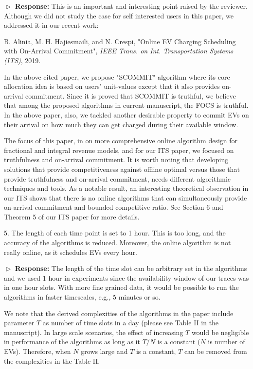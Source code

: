 \documentclass[11pt]{article}
\begin{document}
$\vartriangleright$ \noindent\textbf{Response:} 
This is an important and interesting point raised by the reviewer. Although we did not study the case for self interested users in this paper, we addressed it in our recent work: 

B. Alinia, M. H. Hajiesmaili, and N. Crespi, "Online EV Charging Scheduling with On-Arrival Commitment", \textit{IEEE Trans. on Int. Transportation Systems (ITS)}, 2019.

In the above cited paper, we propose "SCOMMIT" algorithm where its core allocation idea is based on users' unit-values except that it also provides on-arrival commitment. Since it is proved that SCOMMIT is truthful, we believe that among the proposed algorithms in current manuscript, the FOCS is truthful. In the above paper, also, we tackled another desirable property to commit EVs on their arrival on how much they can get charged during their available window. 

The focus of this paper, in on more comprehensive online algorithm design for fractional and integral revenue models, and for our ITS paper, we focused on truthfulness and on-arrival commitment. It is worth noting that developing solutions that provide competitiveness against offline optimal versus those that provide truthfulness and on-arrival commitment, needs different algorithmic techniques and tools. As a notable result, an interesting theoretical observation in our ITS shows that there is no online algorithms that can simultaneously provide on-arrival commitment and bounded competitive ratio. See Section 6 and Theorem 5 of our ITS paper for more details. 

\vspace{3mm}
{\color{blue} 5. The length of each time point is set to 1 hour. This is too long, and the accuracy of the algorithms is reduced. Moreover, the online algorithm is not really online, as it schedules EVs every hour. }
\vspace{3mm}

$\vartriangleright$ \noindent\textbf{Response:} 
The length of the time slot can be arbitrary set in the algorithms and we used 1 hour in experiments since the availability window of our traces was in one hour slots. With more fine grained data, it would be possible to run the algorithms in faster timescales, e.g., 5 minutes or so. 

We note that the derived complexities of the algorithms in the paper include parameter $T$ as number of time slots in a day (please see Table II in the manuscript). In large scale scenarios, the effect of increasing $T$ would be negligible in performance of the algorithms as long as it $T/N$ is a constant ($N$ is number of EVs). Therefore, when $N$ grows large and $T$ is a constant, $T$ can be removed from the complexities in the Table II. 
\end{document}
